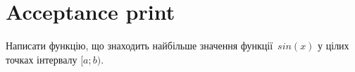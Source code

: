 \documentclass[12pt]{article}
\begin{document}
\section*{Acceptance print}

Написати функцію, що знаходить найбільше значення функції~$sin(x)$ у цілих точках інтервалу $[a; b)$.


\end{document}
